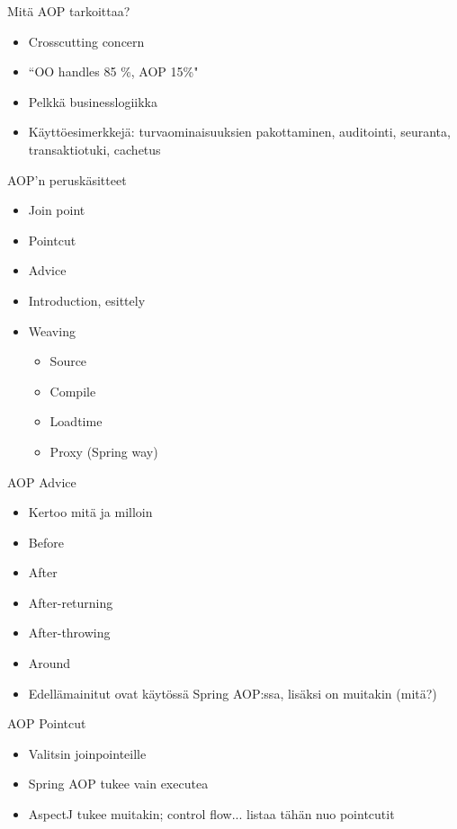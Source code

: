 \documentclass[hyperref={pdfauthor=\AUTHOR},14pt]{beamer}
\author{\AUTHOR}
\title[\TITLE]{\TITLE}
\date{\DATE}
\begin{document}
\begin{frame}[plain]
\titlepage
\end{frame}

\begin{frame}[t, fragile]{Mitä AOP tarkoittaa?}
\begin{itemize}
\item Crosscutting concern
\item ``OO handles 85 \%, AOP 15\%"
\item Pelkkä businesslogiikka
\item Käyttöesimerkkejä: turvaominaisuuksien pakottaminen, auditointi, seuranta, transaktiotuki, cachetus
\end{itemize}
\end{frame}

\begin{frame}[t, fragile]{AOP'n peruskäsitteet}
\begin{itemize}
\item Join point
\item Pointcut
\item Advice
\item Introduction, esittely
\item Weaving
  \begin{itemize}
    \item Source
    \item Compile
    \item Loadtime
    \item Proxy (Spring way)
  \end{itemize}
\end{itemize}
\end{frame}

\begin{frame}[t, fragile]{AOP Advice}
\begin{itemize}
\item Kertoo mitä ja milloin
\item Before
\item After
\item After-returning
\item After-throwing
\item Around
\item Edellämainitut ovat käytössä Spring AOP:ssa, lisäksi on muitakin (mitä?)
\end{itemize}
\end{frame}

\begin{frame}[t, fragile]{AOP Pointcut}
\begin{itemize}
\item Valitsin joinpointeille
\item Spring AOP tukee vain executea
\item AspectJ tukee muitakin; control flow... listaa tähän nuo pointcutit
\end{itemize}
\end{frame}
\end{document}
